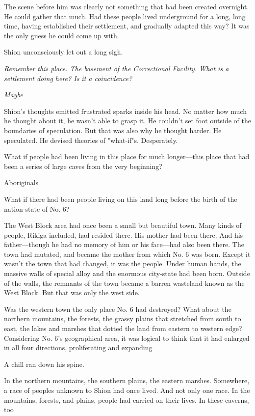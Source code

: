 The scene before him was clearly not something that had been created
overnight. He could gather that much. Had these people lived underground
for a long, long time, having established their settlement, and
gradually adapted this way? It was the only guess he could come up with.

Shion unconsciously let out a long sigh.

\emph{Remember this place. The basement of the Correctional Facility. What is
a settlement doing here? Is it a coincidence?}

\emph{Maybe\el }

Shion's thoughts emitted frustrated sparks inside his head. No matter
how much he thought about it, he wasn't able to grasp it. He couldn't
set foot outside of the boundaries of speculation. But that was also why
he thought harder. He speculated. He devised theories of "what-if"s.
Desperately.

What if people had been living in this place for much longer---this place
that had been a series of large caves from the very beginning?

Aboriginals\el 

What if there had been people living on this land long before the birth
of the nation-state of No. 6?

The West Block area had once been a small but beautiful town. Many kinds
of people, Rikiga included, had resided there. His mother had been
there. And his father---though he had no memory of him or his face---had
also been there. The town had mutated, and became the mother from which
No. 6 was born. Except it wasn't the town that had changed, it was the
people. Under human hands, the massive walls of special alloy and the
enormous city-state had been born. Outside of the walls, the remnants of
the town became a barren wasteland known as the West Block. But that was
only the west side.

Was the western town the only place No. 6 had destroyed? What about the
northern mountains, the forests, the grassy plains that stretched from
south to east, the lakes and marshes that dotted the land from eastern
to western edge? Considering No. 6's geographical area, it was logical
to think that it had enlarged in all four directions, proliferating and
expanding\el 

A chill ran down his spine.

In the northern mountains, the southern plains, the eastern marshes.
Somewhere, a race of peoples unknown to Shion had once lived. And not
only one race. In the mountains, forests, and plains, people had carried
on their lives. In these caverns, too\el 

